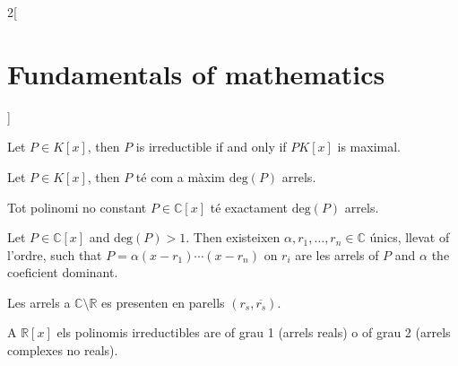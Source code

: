 \documentclass[../../../main.tex]{subfiles}
\begin{document}
\begin{multicols}{2}[\section{Fundamentals of mathematics}]
\begin{definition}
    Let $P\in K[x]$, then $P$ is irreductible if and only if $PK[x]$ is maximal.
    \end{definition}
    \begin{theorem}
    Let $P\in K[x]$, then $P$ té com a màxim $\text{deg}(P)$ arrels.
    \end{theorem}
    \begin{theorem}
    Tot polinomi no constant $P\in\mathbb{C}[x]$ té exactament $\text{deg}(P)$ arrels.
    \end{theorem}
    \begin{corollary}
    Let $P\in\mathbb{C}[x]$ and $\text{deg}(P)>1$. Then existeixen $\alpha,r_1,\ldots,r_n\in\mathbb{C}$ únics, llevat of l'ordre, such that $P=\alpha(x-r_1)\cdots(x-r_n)$ on $r_i$ are les arrels of $P$ and $\alpha$ the coeficient dominant.
    \end{corollary}
    \begin{corollary}
    Les arrels a $\mathbb{C}\setminus\mathbb{R}$ es presenten en parells $(r_s,\overline{r_s})$.
    \end{corollary}
    \begin{theorem}
    A $\mathbb{R}[x]$ els polinomis irreductibles are of grau 1 (arrels reals) o of grau 2 (arrels complexes no reals).
    \end{theorem}
\end{multicols}
\end{document}
